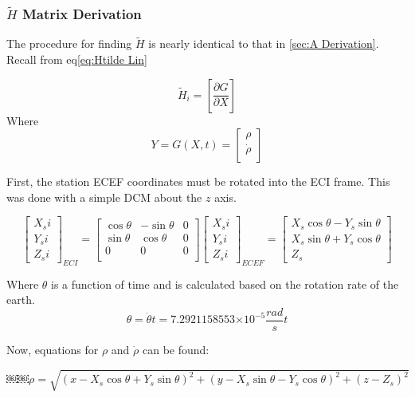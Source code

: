 \documentclass[12pt,a4paper,oneside]{article}
\numberwithin{equation}{section}   		%
\providecommand{\e}[1]{\ensuremath{\times 10^{#1}}}
\newcommand{\parens} [1] {\left(  #1  \right)}
\newcommand{\brackets} [1] {\left[ #1 \right]}
\newcommand{\arrayb}[2]{\brackets{ \begin{array}{#1}  #2 \end{array} } }
\begin{document}
\subsubsection{$\tilde{H}$ Matrix Derivation}
\label{sec:Htilde Derivation}
The procedure for finding $\tilde{H}$ is nearly identical to that in \ref{sec:A Derivation}. Recall from eq\eqref{eq:Htilde Lin} 

\begin{displaymath}
	\tilde{H}_i = \brackets{\frac{\partial G}{\partial X}}
\end{displaymath}
Where
\begin{displaymath}	
		Y=
		G(X,t) =
		\arrayb{c}{
			\rho		\\
			\dot{\rho} 	\\
		}
\end{displaymath}

First, the station ECEF coordinates must be rotated into the ECI frame. This was done with a simple DCM about the $z$ axis.

\begin{equation}
	\arrayb{c}{X_si \\ Y_si \\ Z_si}_{ECI}
	= 
	\arrayb{ccc}{\cos{\theta}		&	-\sin{\theta}	&	0	\\
			\sin{\theta}		&	\cos{\theta}	&	0	\\
				0			&		0		&	0	\\
			}
	\arrayb{c}{X_si \\ Y_si \\ Z_si}_{ECEF}
	=
	\arrayb{c}{X_s\cos{\theta}	-Y_s\sin{\theta}	\\ X_s\sin{\theta}+Y_s\cos{\theta}	\\	Z_s}
\end{equation}

Where $\theta$ is a function of time and is calculated based on the rotation rate of the earth.
\begin{displaymath}
	\theta = \dot{\theta}t = 7.2921158553\e{-5} \frac{rad}{s} t
\end{displaymath}

Now, equations for $\rho$ and $\dot{\rho}$ can be found:

\begin{equation}
 ￼ ￼ \rho = \sqrt{\parens{x-X_s\cos{\theta} + Y_s\sin{\theta}}^2 + \parens{y - X_s\sin{\theta}	-Y_s\cos{\theta}}^2 +	\parens{z-Z_s}^2}
	\label{eq:rho}
\end{equation}
\end{document}
